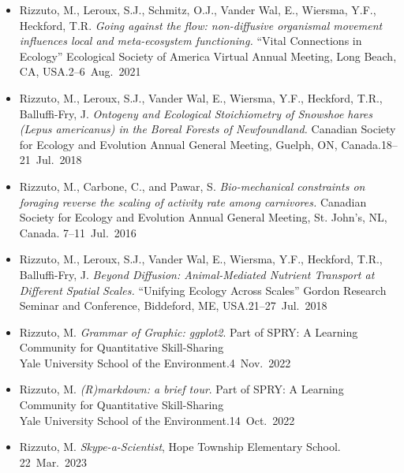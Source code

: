 


\begin{itemize}
  \item \textcolor{awesome}{Rizzuto, M.}, Leroux, S.J., Schmitz, O.J., Vander Wal, E., Wiersma, Y.F., Heckford, T.R. \emph{Going against the flow: non-diffusive organismal movement influences local and meta-ecosystem functioning.} ``Vital Connections in Ecology'' Ecological Society of America Virtual Annual Meeting, Long Beach, CA, USA.\hfill 2--6~Aug.~2021
  \item \textcolor{awesome}{Rizzuto, M.}, Leroux, S.J., Vander Wal, E., Wiersma, Y.F., Heckford, T.R., Balluffi-Fry, J. \emph{Ontogeny and Ecological Stoichiometry of Snowshoe hares (Lepus americanus) in the Boreal Forests of Newfoundland.} Canadian Society for Ecology and Evolution Annual General Meeting, Guelph, ON, Canada.\hfill 18--21~Jul.~2018 
  \item \textcolor{awesome}{Rizzuto, M.}, Carbone, C., and Pawar, S. \emph{Bio-mechanical constraints on foraging reverse the scaling of activity rate among carnivores.} Canadian Society for Ecology and Evolution Annual General Meeting, St. John's, NL,\\ Canada. \hfill 7--11~Jul.~2016
\end{itemize}


\begin{itemize}
  \item \textcolor{awesome}{Rizzuto, M.}, Leroux, S.J., Vander Wal, E., Wiersma, Y.F., Heckford, T.R., Balluffi-Fry, J. \emph{Beyond Diffusion: Animal-Mediated Nutrient Transport at Different Spatial Scales.} ``Unifying Ecology Across Scales'' Gordon Research Seminar and Conference, Biddeford, ME, USA.\hfill 21--27~Jul.~2018
\end{itemize}


\begin{itemize}
  \item \textcolor{awesome}{Rizzuto, M.} \emph{Grammar of Graphic: ggplot2}. Part of SPRY: A Learning Community for Quantitative Skill-Sharing\\ Yale University School of the Environment.\hfill 4~Nov.~2022
  \item \textcolor{awesome}{Rizzuto, M.} \emph{(R)markdown: a brief tour}. Part of SPRY: A Learning Community for Quantitative Skill-Sharing\\ Yale University School of the Environment.\hfill 14~Oct.~2022
\end{itemize}

\begin{itemize}
  \item \textcolor{awesome}{Rizzuto, M.} \emph{Skype-a-Scientist}, Hope Township Elementary School. \hfill 22~Mar.~2023
\end{itemize}

